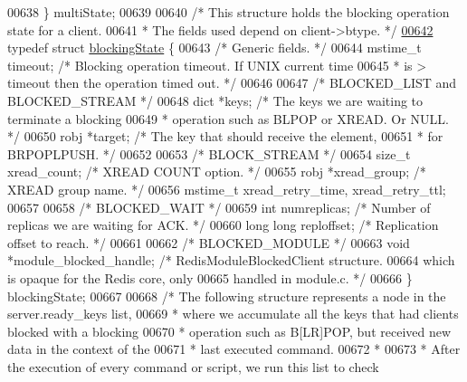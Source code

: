 \begin{DoxyCode}
{{{{{{00638 \} multiState;
00639 
00640 \textcolor{comment}{/* This structure holds the blocking operation state for a client.}
00641 \textcolor{comment}{ * The fields used depend on client->btype. */}
\hyperlink{structblockingState}{00642} \textcolor{keyword}{typedef} \textcolor{keyword}{struct} \hyperlink{structblockingState}{blockingState} \{
00643     \textcolor{comment}{/* Generic fields. */}
00644     mstime\_t timeout;       \textcolor{comment}{/* Blocking operation timeout. If UNIX current time}
00645 \textcolor{comment}{                             * is > timeout then the operation timed out. */}
00646 
00647     \textcolor{comment}{/* BLOCKED\_LIST and BLOCKED\_STREAM */}
00648     dict *keys;             \textcolor{comment}{/* The keys we are waiting to terminate a blocking}
00649 \textcolor{comment}{                             * operation such as BLPOP or XREAD. Or NULL. */}
00650     robj *target;           \textcolor{comment}{/* The key that should receive the element,}
00651 \textcolor{comment}{                             * for BRPOPLPUSH. */}
00652 
00653     \textcolor{comment}{/* BLOCK\_STREAM */}
00654     size\_t xread\_count;     \textcolor{comment}{/* XREAD COUNT option. */}
00655     robj *xread\_group;      \textcolor{comment}{/* XREAD group name. */}
00656     mstime\_t xread\_retry\_time, xread\_retry\_ttl;
00657 
00658     \textcolor{comment}{/* BLOCKED\_WAIT */}
00659     \textcolor{keywordtype}{int} numreplicas;        \textcolor{comment}{/* Number of replicas we are waiting for ACK. */}
00660     \textcolor{keywordtype}{long} \textcolor{keywordtype}{long} reploffset;   \textcolor{comment}{/* Replication offset to reach. */}
00661 
00662     \textcolor{comment}{/* BLOCKED\_MODULE */}
00663     \textcolor{keywordtype}{void} *module\_blocked\_handle; \textcolor{comment}{/* RedisModuleBlockedClient structure.}
00664 \textcolor{comment}{                                    which is opaque for the Redis core, only}
00665 \textcolor{comment}{                                    handled in module.c. */}
00666 \} blockingState;
00667 
00668 \textcolor{comment}{/* The following structure represents a node in the server.ready\_keys list,}
00669 \textcolor{comment}{ * where we accumulate all the keys that had clients blocked with a blocking}
00670 \textcolor{comment}{ * operation such as B[LR]POP, but received new data in the context of the}
00671 \textcolor{comment}{ * last executed command.}
00672 \textcolor{comment}{ *}
00673 \textcolor{comment}{ * After the execution of every command or script, we run this list to check}
}}}}}}
\end{DoxyCode}
